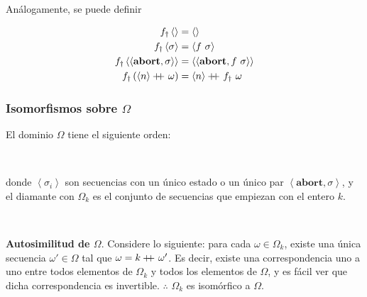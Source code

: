 \documentclass[a4paper, 12pt]{article}
\newcommand\doubleplus{+\kern-1.3ex+\kern0.8ex}
\begin{document}
Análogamente, se puede definir 

\begin{align*}
  f_\dagger\left< \right> &= \left< \right> \\ 
  f_\dagger \left<\sigma \right> &= \left<f ~ \sigma \right> \\ 
  f_\dagger \left<\left<\textbf{abort}, \sigma \right> \right> &=
  \left<\left<\textbf{abort}, f ~\sigma \right> \right> \\ 
  f_\dagger \left( \left<n \right> \doubleplus \omega \right) &= \left<n \right>
  \doubleplus f_\dagger ~ \omega
\end{align*}

\subsubsection{Isomorfismos sobre $\Omega$}

El dominio $\Omega$ tiene el siguiente orden:

~
\begin{figure}[!h]
\centering
{}
\end{figure} 
 


donde $\left<\sigma_i \right>$ son secuencias con un único estado o un único par
$\left<\textbf{abort}, \sigma \right>$, y el diamante con $\Omega_k$ es el conjunto de
secuencias que empiezan con el entero $k$.

~

\textbf{Autosimilitud de $\Omega$}. Considere lo siguiente: para cada $\omega \in \Omega_k$, existe una única
secuencia $\omega'\in \Omega$ tal que $\omega = k \doubleplus \omega'$. Es
decir, existe una correspondencia uno a uno entre todos elementos de $\Omega_k$ y
todos los elementos de $\Omega$, y es fácil ver que dicha correspondencia es
invertible. $\therefore $ $\Omega_k$ es isomórfico a $\Omega$.
\end{document}
